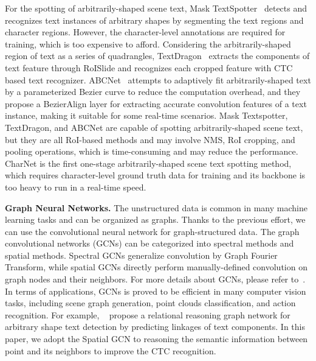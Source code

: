 \documentclass[letterpaper]{article} \usepackage{aaai21}  \usepackage{times}  \usepackage{helvet} \usepackage{courier}  \usepackage[hyphens]{url}  \usepackage{graphicx} \urlstyle{rm} \def\UrlFont{\rm}  \usepackage{natbib}  \usepackage{caption} \usepackage{bm}
\begin{document}
For the spotting of arbitrarily-shaped scene text, Mask TextSpotter~\cite{yao2018mask} detects and recognizes text instances of arbitrary shapes by segmenting the text regions and character regions. However, the character-level annotations are required for training, which is too expensive to afford. Considering the arbitrarily-shaped region of text as a series of quadrangles, TextDragon~\cite{feng2019textdragon} extracts the components of text feature through RoISlide and recognizes each cropped feature with CTC based text recognizer. ABCNet~\cite{liu2020abcnet} attempts to adaptively fit arbitrarily-shaped text by a parameterized Bezier curve to reduce the computation overhead, and they propose a BezierAlign layer for extracting accurate convolution features of a text instance, making it suitable for some real-time scenarios. Mask Textspotter, TextDragon, and ABCNet are capable of spotting arbitrarily-shaped scene text, but they are all RoI-based methods and may involve NMS, RoI cropping, and pooling operations, which is time-consuming and may reduce the performance. 
CharNet is the first one-stage arbitrarily-shaped scene text spotting method, which requires character-level ground truth data for training and its backbone is too heavy to run in a real-time speed.

\textbf{Graph Neural Networks.} The unstructured data is common in many machine learning tasks and can be organized as graphs. Thanks to the previous effort, we can use the convolutional neural network for graph-structured data. The graph convolutional networks (GCNs) can be categorized into spectral methods and spatial methods. Spectral GCNs generalize convolution by Graph Fourier Transform, while spatial GCNs directly perform manually-defined convolution on graph nodes and their neighbors. For more details about GCNs, please refer to~\cite{wu2019comprehensive}. In terms of applications, GCNs is proved to be efficient in many computer vision tasks, including scene graph generation, point clouds classification, and action recognition. For example, \citeauthor{zhang2020det}~ propose a relational reasoning graph network for arbitrary shape text detection by predicting linkages of text components. In this paper, we adopt the Spatial GCN to reasoning the semantic information between point and its neighbors to improve the CTC recognition.
\end{document}
